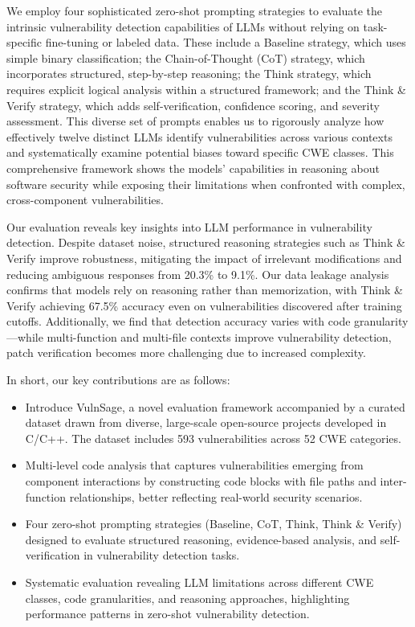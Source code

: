 \documentclass[sigconf]{acmart}
\begin{document}
We employ four sophisticated zero-shot prompting strategies to evaluate the intrinsic vulnerability detection capabilities of LLMs without relying on task-specific fine-tuning or labeled data. These include a Baseline strategy, which uses simple binary classification; the Chain-of-Thought (CoT) strategy, which incorporates structured, step-by-step reasoning; the Think strategy, which requires explicit logical analysis within a structured framework; and the Think \& Verify strategy, which adds self-verification, confidence scoring, and severity assessment. This diverse set of prompts enables us to rigorously analyze how effectively twelve distinct LLMs identify vulnerabilities across various contexts and systematically examine potential biases toward specific CWE classes. This comprehensive framework shows the models' capabilities in reasoning about software security while exposing their limitations when confronted with complex, cross-component vulnerabilities. 

Our evaluation reveals key insights into LLM performance in vulnerability detection. Despite dataset noise, structured reasoning strategies such as Think \& Verify improve robustness, mitigating the impact of irrelevant modifications and reducing ambiguous responses from 20.3\% to 9.1\%. Our data leakage analysis confirms that models rely on reasoning rather than memorization, with Think \& Verify achieving 67.5\% accuracy even on vulnerabilities discovered after training cutoffs. Additionally, we find that detection accuracy varies with code granularity—while multi-function and multi-file contexts improve vulnerability detection, patch verification becomes more challenging due to increased complexity. 

In short, our key contributions are as follows: 
\begin{itemize}[leftmargin=*, labelsep=5mm]
\item Introduce VulnSage, a novel evaluation framework accompanied by a curated dataset drawn from diverse, large-scale open-source projects developed in C/C++. The dataset includes 593 vulnerabilities across 52 CWE categories.
\item Multi-level code analysis that captures vulnerabilities emerging from component interactions by constructing code blocks with file paths and inter-function relationships, better reflecting real-world security scenarios.

\item Four zero-shot prompting strategies (Baseline, CoT, Think, Think \& Verify) designed to evaluate structured reasoning, evidence-based analysis, and self-verification in vulnerability detection tasks.

\item Systematic evaluation revealing LLM limitations across different CWE classes, code granularities, and reasoning approaches, highlighting performance patterns in zero-shot vulnerability detection.
\end{itemize}
\end{document}
